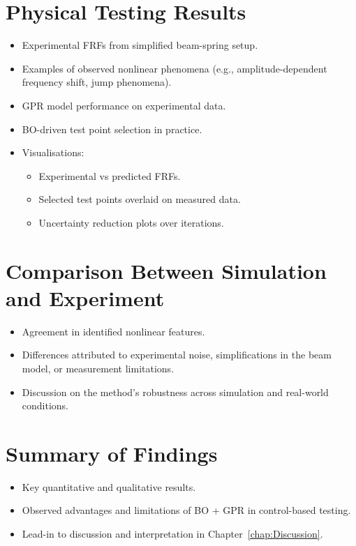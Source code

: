 \section{Physical Testing Results}
\begin{itemize}
    \item Experimental FRFs from simplified beam-spring setup.
    \item Examples of observed nonlinear phenomena (e.g., amplitude-dependent frequency shift, jump phenomena).
    \item GPR model performance on experimental data.
    \item BO-driven test point selection in practice.
    \item Visualisations:
    \begin{itemize}
        \item Experimental vs predicted FRFs.
        \item Selected test points overlaid on measured data.
        \item Uncertainty reduction plots over iterations.
    \end{itemize}
\end{itemize}

\section{Comparison Between Simulation and Experiment}
\begin{itemize}
    \item Agreement in identified nonlinear features.
    \item Differences attributed to experimental noise, simplifications in the beam model, or measurement limitations.
    \item Discussion on the method’s robustness across simulation and real-world conditions.
\end{itemize}

\section{Summary of Findings}
\begin{itemize}
    \item Key quantitative and qualitative results.
    \item Observed advantages and limitations of BO + GPR in control-based testing.
    \item Lead-in to discussion and interpretation in Chapter~\ref{chap:Discussion}.
\end{itemize}
